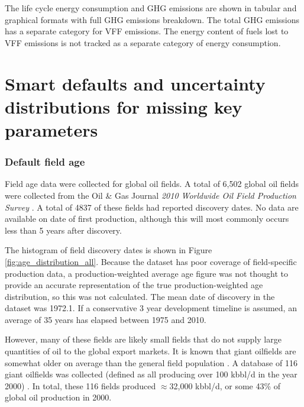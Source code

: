 \documentclass[11pt]{report}
\newcommand{\marg}[1]{{\footnotesize\textit{\textcolor{stanford}{'#1'}}}}
\newcommand{\marginnote}[1]{\marginpar{\marg{#1}}}
\begin{document}
The life cycle energy consumption and \marginnote{Active Field \\ Tables 1.1 - 1.2 \\ Figures 1.1 - 1.2 } GHG emissions are shown in tabular and graphical formats with full GHG emissions breakdown. The total GHG emissions has a separate category for VFF emissions. The energy content of fuels lost to VFF emissions is not tracked as a separate category of energy consumption. 


\clearpage

\section{Smart defaults and uncertainty distributions for missing key parameters}
\label{sec:smart_defaults}


\subsubsection{Default field age}

Field age data were collected for global oil fields. A total of 6,502 global oil fields were collected from the Oil \& Gas Journal \emph{2010 Worldwide Oil Field Production Survey} \cite{OGJ2009a}. A total of 4837 of these fields had reported discovery dates. No data are available on date of first production, although this will most commonly occurs less than 5 years after discovery.

The histogram of field discovery dates is shown in Figure \ref{fig:age_distribution_all}. Because the dataset has poor coverage of field-specific production data, a production-weighted average age figure was not thought to provide an accurate representation of the true production-weighted age distribution, so this was not calculated. The mean date of discovery in the dataset was 1972.1. \marginnote{Active Field 2.2.3} If a conservative 3 year development timeline is assumed, an average of 35 years has elapsed between 1975 and 2010.

However, many of these fields are likely small fields that do not supply large quantities of oil to the global export markets. It is known that giant oilfields are somewhat older on average than the general field population \cite{Simmons2005, Simmons2006, Deffeyes2001, Deffeyes2005}. A database of 116 giant oilfields was collected (defined as all producing over 100 kbbl/d in the year 2000) \cite[Appendix A]{Simmons2006}. In total, these 116 fields produced $\approx$32,000 kbbl/d, or some 43\% of global oil production in 2000.
\end{document}
